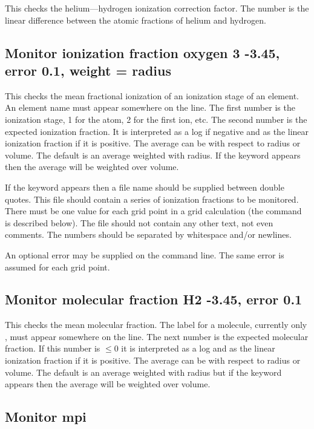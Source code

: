 This checks the helium---hydrogen ionization correction factor.
The number is the linear difference between the atomic fractions
of helium and hydrogen.

\subsection{Monitor ionization fraction oxygen 3 -3.45, error 0.1, weight =
radius}

This checks the mean fractional ionization of an ionization stage of
an element.
An element name must appear somewhere on the line.
The first
number is the ionization stage, 1 for the atom, 2 for the first ion, etc.
The second number is the expected ionization fraction.
It is interpreted
as a log if negative and as the linear ionization fraction if it is positive.
The average can be with respect to radius or volume.
The default is an
average weighted with radius.
If the keyword  appears then the average
will be weighted over volume.

If the keyword  appears then a file name should be supplied
between double quotes. This file should contain a series of ionization
fractions to be monitored. There must be one value for each grid point in a
grid calculation (the  command is described below). The file
should not contain any other text, not even comments. The numbers should be
separated by whitespace and/or newlines.

An optional error may be supplied on the command line. The same error is
assumed for each grid point.

\subsection{Monitor molecular fraction H2 -3.45, error 0.1}

This checks the mean molecular fraction.
The label for a molecule,
currently only \htwo, must appear somewhere on the line.
The next number is
the expected molecular fraction.
If this number is $\le 0$ it is interpreted
as a log and as the linear ionization fraction if it is positive.
The
average can be with respect to radius or volume.
The default is an average
weighted with radius but if the keyword  appears then the average
will be weighted over volume.

\subsection{Monitor mpi}

